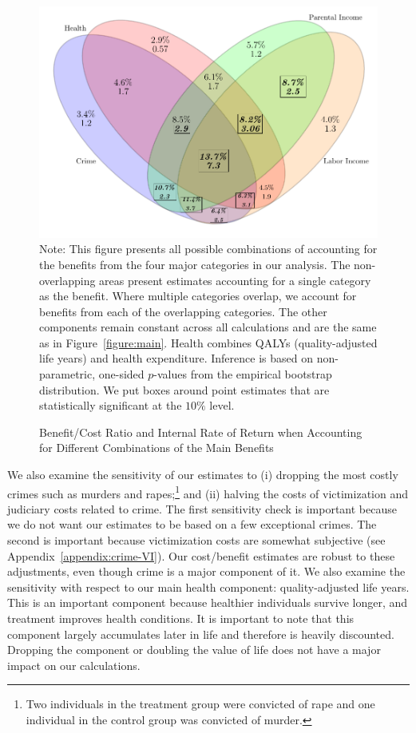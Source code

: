 \begin{figure}[!htbp]
\caption{Benefit/Cost Ratio and Internal Rate of Return when Accounting for Different Combinations of the Main Benefits}\label{figure:vennpooled}
\centering
\includegraphics[width=.7\columnwidth]{output/venn_pooled.pdf}
\footnotesize \justify
Note: This figure presents all possible combinations of accounting for the benefits from the four major categories in our analysis. The non-overlapping areas present estimates accounting for a single category as the benefit. Where multiple categories overlap, we account for benefits from each of the overlapping categories. The other components remain constant across all calculations and are the same as in Figure~\ref{figure:main}. Health combines QALYs (quality-adjusted life years) and health expenditure. Inference is based on non-parametric, one-sided $p$-values from the empirical bootstrap distribution. We put boxes around point estimates that are statistically significant at the $10\%$ level.
\end{figure}

\noindent We also examine the sensitivity of our estimates to (i) dropping the most costly crimes such as murders and rapes;\footnote{Two individuals in the treatment group were convicted of rape and one individual in the control group was convicted of murder.} and (ii) halving the costs of victimization and judiciary costs related to crime. The first sensitivity check is important because we do not want our estimates to be based on a few exceptional crimes. The second is important because victimization costs are somewhat subjective (see  Appendix~\ref{appendix:crime-VI}). Our cost/benefit estimates are robust to these adjustments, even though crime is a major component of it. We also examine the sensitivity with respect to our main health component: quality-adjusted life years. This is an important component because healthier individuals survive longer, and treatment improves health conditions. It is important to note that this component largely accumulates later in life and therefore is heavily discounted. Dropping the component or doubling the value of life does not have a major impact on our calculations.\\

